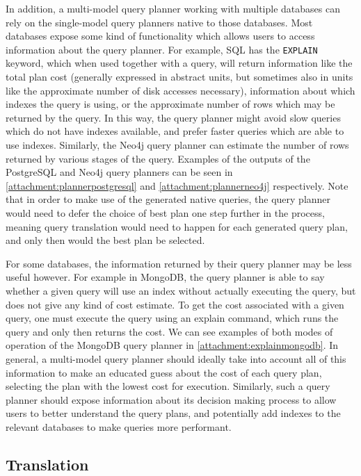 In addition, a multi-model query planner working with multiple databases can rely on the single-model query planners native to those databases.
Most databases expose some kind of functionality which allows users to access information about the query planner.
For example, SQL has the \texttt{EXPLAIN} keyword, which when used together with a query, will return information like the total plan cost (generally expressed in abstract units, but sometimes also in units like the approximate number of disk accesses necessary), information about which indexes the query is using, or the approximate number of rows which may be returned by the query.
In this way, the query planner might avoid slow queries which do not have indexes available, and prefer faster queries which are able to use indexes.
Similarly, the Neo4j query planner can estimate the number of rows returned by various stages of the query.
Examples of the outputs of the PostgreSQL and Neo4j query planners can be seen in \cref{attachment:plannerpostgresql} and \cref{attachment:plannerneo4j} respectively.
Note that in order to make use of the generated native queries, the query planner would need to defer the choice of best plan one step further in the process, meaning query translation would need to happen for each generated query plan, and only then would the best plan be selected.

For some databases, the information returned by their query planner may be less useful however.
For example in MongoDB, the query planner is able to say whether a given query will use an index without actually executing the query, but does not give any kind of cost estimate.
To get the cost associated with a given query, one must execute the query using an explain command, which runs the query and only then returns the cost.
We can see examples of both modes of operation of the MongoDB query planner in \cref{attachment:explainmongodb}.
In general, a multi-model query planner should ideally take into account all of this information to make an educated guess about the cost of each query plan, selecting the plan with the lowest cost for execution.
Similarly, such a query planner should expose information about its decision making process to allow users to better understand the query plans, and potentially add indexes to the relevant databases to make queries more performant.

\subsection{Translation}
\label{algo:subsection:translation}

